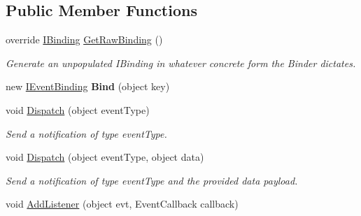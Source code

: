 \subsection*{Public Member Functions}
\begin{DoxyCompactItemize}
\item 
\hypertarget{classstrange_1_1extensions_1_1dispatcher_1_1eventdispatcher_1_1impl_1_1_event_dispatcher_a45e80262b4266392dfe90b5ef5985002}{override \hyperlink{interfacestrange_1_1framework_1_1api_1_1_i_binding}{I\-Binding} \hyperlink{classstrange_1_1extensions_1_1dispatcher_1_1eventdispatcher_1_1impl_1_1_event_dispatcher_a45e80262b4266392dfe90b5ef5985002}{Get\-Raw\-Binding} ()}\label{classstrange_1_1extensions_1_1dispatcher_1_1eventdispatcher_1_1impl_1_1_event_dispatcher_a45e80262b4266392dfe90b5ef5985002}

\begin{DoxyCompactList}\small\item\em Generate an unpopulated I\-Binding in whatever concrete form the Binder dictates. \end{DoxyCompactList}\item 
\hypertarget{classstrange_1_1extensions_1_1dispatcher_1_1eventdispatcher_1_1impl_1_1_event_dispatcher_a42c7118c3b362edefc631de15eb133b8}{new \hyperlink{interfacestrange_1_1extensions_1_1dispatcher_1_1eventdispatcher_1_1api_1_1_i_event_binding}{I\-Event\-Binding} {\bfseries Bind} (object key)}\label{classstrange_1_1extensions_1_1dispatcher_1_1eventdispatcher_1_1impl_1_1_event_dispatcher_a42c7118c3b362edefc631de15eb133b8}

\item 
void \hyperlink{classstrange_1_1extensions_1_1dispatcher_1_1eventdispatcher_1_1impl_1_1_event_dispatcher_a70d8d7740798e10f960c866e03c4639b}{Dispatch} (object event\-Type)
\begin{DoxyCompactList}\small\item\em Send a notification of type event\-Type. \end{DoxyCompactList}\item 
void \hyperlink{classstrange_1_1extensions_1_1dispatcher_1_1eventdispatcher_1_1impl_1_1_event_dispatcher_a14124806e6632e75aa0ff0c02d23483b}{Dispatch} (object event\-Type, object data)
\begin{DoxyCompactList}\small\item\em Send a notification of type event\-Type and the provided data payload. \end{DoxyCompactList}\item 
\hypertarget{classstrange_1_1extensions_1_1dispatcher_1_1eventdispatcher_1_1impl_1_1_event_dispatcher_a3166e079ccd3bbfd676cb77b78f0e72f}{void \hyperlink{classstrange_1_1extensions_1_1dispatcher_1_1eventdispatcher_1_1impl_1_1_event_dispatcher_a3166e079ccd3bbfd676cb77b78f0e72f}{Add\-Listener} (object evt, Event\-Callback callback)}\label{classstrange_1_1extensions_1_1dispatcher_1_1eventdispatcher_1_1impl_1_1_event_dispatcher_a3166e079ccd3bbfd676cb77b78f0e72f}


\end{DoxyCompactItemize}
